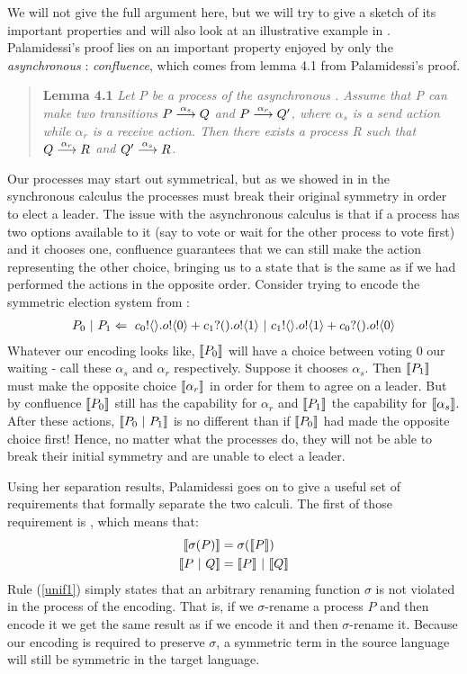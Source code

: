 We will not give the full argument here, but we will try to give a sketch of its important properties and will also look at an illustrative example in .  
Palamidessi's proof lies on an important property enjoyed by only the \emph{asynchronous} \picalc:  
\emph{confluence}, which comes from lemma 4.1 from Palamidessi's proof.
\begin{quote}
	\textbf{Lemma 4.1} \emph{Let P be a process of the asynchronous \picalc.  Assume that P can make two transitions $P \overset{{\alpha_s}}{\longrightarrow} Q$ and $P \overset{{\alpha_r}}{\longrightarrow} Q'$, where $\alpha_s$ is a send action while $\alpha_r$ is a receive action.  Then there exists a process R such that $Q \overset{{\alpha_r}}{\longrightarrow} R$ and $Q' \overset{{\alpha_s}}{\longrightarrow} R$.}
\end{quote}
Our processes may start out symmetrical, but as we showed in  in the synchronous calculus the processes must break their original symmetry in order to elect a leader.  
The issue with the asynchronous calculus is that if a process has two options available to it (say to vote or wait for the other process to vote first) and it chooses one, confluence guarantees that we can still make the action representing the other choice, bringing us to a state that is the same as if we had performed the actions in the opposite order.  
Consider trying to encode the symmetric election system from :
\begin{align}
	P_0\ |\  P_1 \Leftarrow\  {c_0}!\langle{}\rangle. {o}!\langle{0}\rangle + {c_1}?({}). {o}!\langle{1}\rangle \ |\  {c_1}!\langle{}\rangle. {o}!\langle{1}\rangle + {c_0}?({}). {o}!\langle{0}\rangle
	\label{leader_network_term2}	
\end{align}
Whatever our encoding looks like, $\llbracket{P_0}\rrbracket$ will have a choice between voting 0 our waiting - call these $\alpha_s$ and $\alpha_r$ respectively.  
Suppose it chooses $\alpha_s$.  
Then $\llbracket{P_1}\rrbracket$ must make the opposite choice $\llbracket{\alpha_r}\rrbracket$ in order for them to agree on a leader.  
But by confluence $\llbracket{P_0}\rrbracket$ still has the capability for $\alpha_r$ and $\llbracket{P_1}\rrbracket$ the capability for $\llbracket{\alpha_s}\rrbracket$.  
After these actions, $\llbracket{P_0  \ensuremath{\ |\ } P_1}\rrbracket$ is no different than if $\llbracket{P_0}\rrbracket$ had made the opposite choice first!  Hence, no matter what the processes do, they will not be able to break their initial symmetry and are unable to elect a leader.

Using her separation results, Palamidessi goes on to give a useful set of requirements that formally separate the two calculi.
The first of those requirement is , which means that:
\begin{align}
	\llbracket{\sigma(P)}\rrbracket &= \sigma(\llbracket{P}\rrbracket)\label{unif1}\\
	\llbracket{P \ensuremath{\ |\ } Q}\rrbracket &= \llbracket{P}\rrbracket \ |\  \llbracket{Q}\rrbracket\label{unif2}
\end{align}
Rule (\ref{unif1}) simply states that an arbitrary renaming function $\sigma$ is not violated in the process of the encoding.  
That is, if we $\sigma$-rename a process $P$ and then encode it we get the same result as if we encode it and then $\sigma$-rename it.  
Because our encoding is required to preserve $\sigma$, a symmetric term in the source language will still be symmetric in the target language.

